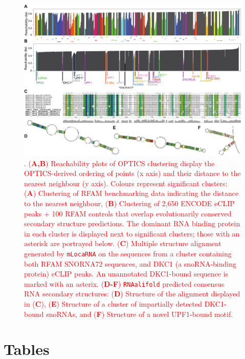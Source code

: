 \documentclass{bmcart}
\begin{document}
\begin{backmatter}
\begin{figure}[h!]
 \includegraphics[width=\textwidth]{Fig5}
 \caption {. 
 \textcolor{red} {
 (\textbf{A,B}) Reachability plots of OPTICS clustering display the OPTICS-derived ordering of points (x axis) and their distance to the nearest neighbour (y axis). Colours represent significant clusters: (\textbf{A}) Clustering of RFAM benchmarking data indicating the distance to the nearest neighbour,
 (\textbf{B}) Clustering of 2,650 ENCODE eCLIP peaks + 100 RFAM controls that overlap evolutionarily conserved secondary structure predictions. The dominant RNA binding protein in each cluster is displayed next to significant clusters; those with an asterisk are portrayed below.
 (\textbf{C}) Multiple structure alignment generated by \texttt{mLocaRNA} on the sequences from a 
 cluster containing both RFAM SNORNA72 sequences, and DKC1 (a snoRNA-binding protein) eCLIP peaks. 
An unannotated DKC1-bound sequence is marked with an asterix.
 (\textbf{D-F}) \texttt{RNAalifold} predicted consensus RNA secondary structures: 
 (\textbf{D}) Structure of the alignment displayed in (\textbf{C}), 
 (\textbf{E}) Structure of a cluster of impartially detected DKC1-bound snoRNAs, and
 (\textbf{F}) Structure of a novel UPF1-bound motif. }}
\end{figure}



\section*{Tables}


\end{backmatter}
\end{document}
